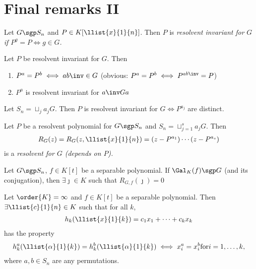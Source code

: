 \documentclass[a4paper]{article}
\begin{document}
\section{Final remarks II}
\begin{tdefinition}
Let \( G\sgp S_n \) and \( P\in K[\llist{x}{1}{n}] \).
Then \( P \) is \it{resolvent invariant} for \( G \) if \( P^{g} = P \iff g\in G \).
\end{tdefinition}

\begin{tlemma}
  Let \( P \) be resolvent invariant for \( G \).
  Then \begin{enumerate}
    \item \( P^a = P^b \iff ab\inv \in G \) (obvious: \( P^a = P^b \iff P^{ab\inv} = P \))
    \item \( P^a \) is resolvent invariant for \( a\inv G a \)
  \end{enumerate}
\end{tlemma}

\begin{tcorollary}
  Let \( S_n = \sqcup_j a_j G \).
  Then \( P \) is resolvent invariant for \( G \iff P^{a_j} \) are distinct.
\end{tcorollary}

\begin{tdefinition}[Resolvent]
  Let \( P \) be a resolvent polynomial for \( G\sgp S_n \) and \( S_n = \sqcup_{j=1}^{s} a_j G \).
  Then \begin{align*}
    R_G(z) = R_G(z,\llist{x}{1}{n}) = (z-P^{a_1})\cdots(z-P^{a_s})
  \end{align*}
  is a \it{resolvent} for \( G \) (depends on \( P \)).
\end{tdefinition}

\begin{tlemma}
  Let \( G\sgp S_n \), \( f\in K[t] \) be a separable polynomial.
  If \( \Gal_K(f) \sgp G \) (and its conjugation), then \( \exists \jmath\in K \) such that \( R_{G,f}(\jmath) = 0 \)
\end{tlemma}

\begin{tlemma}
  Let \( \order{K}=\infty \) and \( f\in K[t] \) be a separable polynomial.
  Then \( \exists \llist{c}{1}{n}\in K \) such that for all \( k \), \begin{align*}
    h_k(\llist{x}{1}{k}) = c_1x_1+\cdots+c_kx_k
  \end{align*}
  has the property \begin{align*}
    h_k^a(\llist{\alpha}{1}{k}) = h_k^b(\llist{\alpha}{1}{k}) \iff x_i^{a} = x_i^{b} \mathrm{ for } i = 1,\ldots,k,
  \end{align*}
  where \( a,b\in S_n \) are any permutations.
\end{tlemma}
\end{document}
